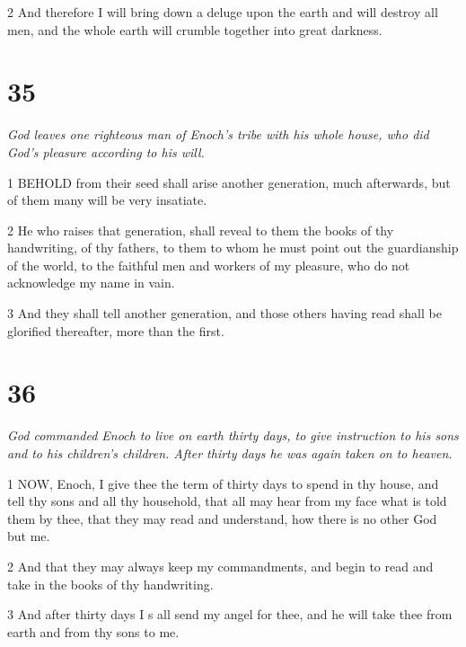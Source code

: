 \par 2 And therefore I will bring down a deluge upon the earth and will destroy all men, and the whole earth will crumble together into great darkness.

\chapter{35}

\par \textit{God leaves one righteous man of Enoch's tribe with his whole house, who did God's pleasure according to his will.}

\par 1 BEHOLD from their seed shall arise another generation, much afterwards, but of them many will be very insatiate.

\par 2 He who raises that generation, shall reveal to them the books of thy handwriting, of thy fathers, to them to whom he must point out the guardianship of the world, to the faithful men and workers of my pleasure, who do not acknowledge my name in vain.

\par 3 And they shall tell another generation, and those others having read shall be glorified thereafter, more than the first.

\chapter{36}

\par \textit{God commanded Enoch to live on earth thirty days, to give instruction to his sons and to his children's children. After thirty days he was again taken on to heaven.}

\par 1 NOW, Enoch, I give thee the term of thirty days to spend in thy house, and tell thy sons and all thy household, that all may hear from my face what is told them by thee, that they may read and understand, how there is no other God but me.

\par 2 And that they may always keep my commandments, and begin to read and take in the books of thy handwriting.

\par 3 And after thirty days I s all send my angel for thee, and he will take thee from earth and from thy sons to me.

